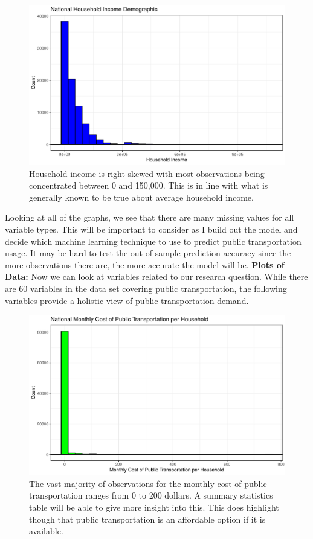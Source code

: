 \documentclass{article}
\begin{document}
\begin{figure}[H]
\centering
\includegraphics{Thesis_Proposal-007}
\caption{Household income is right-skewed with most observations being concentrated between 0 and 150,000. This is in line with what is generally known to be true about average household income.}
\label{Figure 6}
\end{figure}

Looking at all of the graphs, we see that there are many missing values for all variable types. This will be important to consider as I build out the model and decide which machine learning technique to use to predict public transportation usage. It may be hard to test the out-of-sample prediction accuracy since the more observations there are, the more accurate the model will be.
\newline
\newline \noindent \textbf{Plots of Data:}
\newline Now we can look at variables related to our research question. While there are 60 variables in the data set covering public transportation, the following variables provide a holistic view of public transportation demand.

\begin{figure}[H]
\centering
\includegraphics{Thesis_Proposal-008}
\caption{The vast majority of observations for the monthly cost of public transportation ranges from 0 to 200 dollars. A summary statistics table will be able to give more insight into this. This does highlight though that public transportation is an affordable option if it is available.}
\label{Figure 7}
\end{figure}
\end{document}
